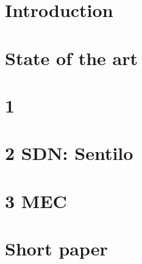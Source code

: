 \documentclass[a4paper, 12pt, twoside,openright]{report}
\begin{document}
\preface
\body

\chapter{Introduction}
	

\chapter
	[''Given one hour to save the planet, I would spend 59 minutes understanding the problem and one minute resolving it.'' - Albert Einstein]
	{State of the art \cite{bregell_hardware_2015}}

	
	
	
	
	
	

\chapter{1 \cite{bregell_hardware_2015}}
	
	
	
	
	
	
	
	

\chapter{2 SDN: Sentilo \cite{_contiki_2016a}}
	
	
	
	
	
	
	
	

\chapter{3 MEC}
	
	
	
	
	
	
	
	

\chapter{Short paper}
	
	
	
	
	
	
	
	
\end{document}

